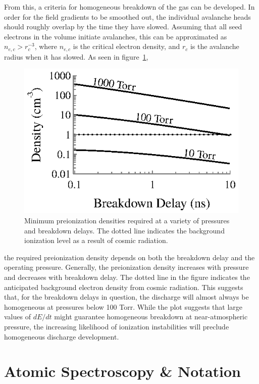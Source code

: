 From this, a criteria for homogeneous breakdown of the gas can be developed. In
order for the field gradients to be smoothed out, the individual avalanche heads
should roughly overlap by the time they have slowed. Assuming that all seed
electrons in the volume initiate avalanches, this can be approximated as
$n_{e,c} > r_c^{-3}$, where $n_{e,c}$ is the critical electron density, and
$r_c$ is the avalanche radius when it has slowed. As seen in
figure~\ref{fig:avalanche_densities},
\begin{figure}
  \centering
  \includegraphics{./chapters/theory/figures/avalanche_densities.eps}
  \caption{Minimum preionization densities required at a variety of pressures
    and breakdown delays. The dotted line indicates the background ionization
    level as a result of cosmic radiation.}
  \label{fig:avalanche_densities}
\end{figure}
the required preionization density depends on both the breakdown delay and the
operating pressure. Generally, the preionization density increases with pressure
and decreases with breakdown delay. The dotted line in the figure indicates the
anticipated background electron density from cosmic radiation. This suggests
that, for the breakdown delays in question, the discharge will almost always be
homogeneous at pressures below 100 Torr. While the plot suggests that large
values of $dE/dt$ might guarantee homogeneous breakdown at near-atmospheric
pressure, the increasing likelihood of ionization instabilities \cite{Johns1972}
will preclude homogeneous discharge development.

\section{Atomic Spectroscopy \& Notation}

